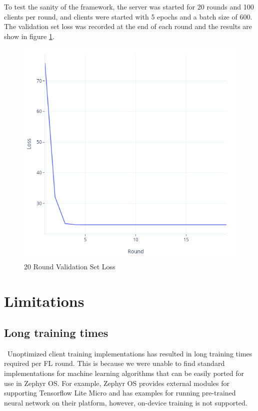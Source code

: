 \documentclass[12pt]{article}
\begin{document}
To test the sanity of the framework, the server was started for 20 rounds and 100 clients per round,
and clients were started with 5 epochs and a batch size of 600. The validation set loss was recorded
at the end of each round and the results are show in figure \ref{fig:loss}.

\begin{figure}
  \includegraphics[scale=0.5]{loss}
  \caption{20 Round Validation Set Loss}
  \label{fig:loss}
\centering
\end{figure}

\section{Limitations}
\subsection{Long training times}\
Unoptimized client training implementations has resulted in long training times required per FL
round. This is because we were unable to find standard implementations for machine learning
algorithms that can be easily ported for use in Zephyr OS. For example, Zephyr OS provides external modules
for supporting Tensorflow Lite Micro\cite{tensorflow2015-whitepaper} and has examples for running pre-trained neural network
on their platform, however, on-device training is not supported.
\end{document}
